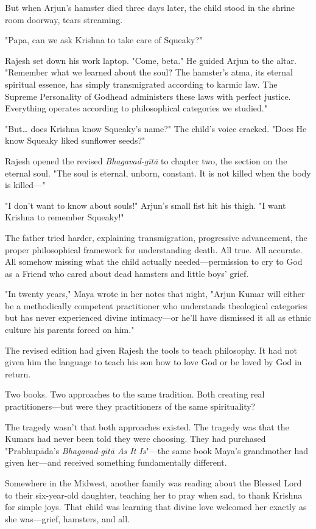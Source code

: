 \documentclass[12pt,twoside]{book}
\begin{document}
But when Arjun's hamster died three days later, the child stood in the shrine room doorway, tears streaming.

"Papa, can we ask Krishna to take care of Squeaky?"

Rajesh set down his work laptop. "Come, beta." He guided Arjun to the altar. "Remember what we learned about the soul? The hamster's atma, its eternal spiritual essence, has simply transmigrated according to karmic law. The Supreme Personality of Godhead administers these laws with perfect justice. Everything operates according to philosophical categories we studied."

"But\ldots{} does Krishna know Squeaky's name?" The child's voice cracked. "Does He know Squeaky liked sunflower seeds?"

Rajesh opened the revised \emph{Bhagavad-gītā} to chapter two, the section on the eternal soul. "The soul is eternal, unborn, constant. It is not killed when the body is killed—"

"I don't want to know about souls!" Arjun's small fist hit his thigh. "I want Krishna to remember Squeaky!"

The father tried harder, explaining transmigration, progressive advancement, the proper philosophical framework for understanding death. All true. All accurate. All somehow missing what the child actually needed—permission to cry to God as a Friend who cared about dead hamsters and little boys' grief.

"In twenty years," Maya wrote in her notes that night, "Arjun Kumar will either be a methodically competent practitioner who understands theological categories but has never experienced divine intimacy—or he'll have dismissed it all as ethnic culture his parents forced on him."

The revised edition had given Rajesh the tools to teach philosophy. It had not given him the language to teach his son how to love God or be loved by God in return.

Two books. Two approaches to the same tradition. Both creating real practitioners—but were they practitioners of the same spirituality?

The tragedy wasn't that both approaches existed. The tragedy was that the Kumars had never been told they were choosing. They had purchased "Prabhupāda's \emph{Bhagavad-gītā As It Is}"—the same book Maya's grandmother had given her—and received something fundamentally different.

Somewhere in the Midwest, another family was reading about the Blessed Lord to their six-year-old daughter, teaching her to pray when sad, to thank Krishna for simple joys. That child was learning that divine love welcomed her exactly as she was—grief, hamsters, and all.
\end{document}

